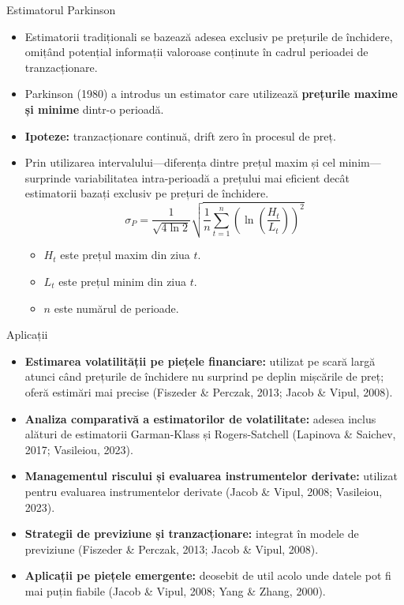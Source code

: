 \documentclass[9pt, aspectratio=169, t]{beamer}
\theoremstyle{definition}
\begin{document}
\begin{frame}{Estimatorul Parkinson}
\begin{itemize}
    \item Estimatorii tradiționali se bazează adesea exclusiv pe prețurile de închidere, omițând potențial informații valoroase conținute în cadrul perioadei de tranzacționare.
    \item Parkinson (1980) a introdus un estimator care utilizează \textbf{prețurile maxime și minime} dintr-o perioadă.
    \item \textbf{Ipoteze:} tranzacționare continuă, drift zero în procesul de preț.
    \item Prin utilizarea intervalului---diferența dintre prețul maxim și cel minim---surprinde variabilitatea intra-perioadă a prețului mai eficient decât estimatorii bazați exclusiv pe prețuri de închidere.
    \[
    \sigma_P = \frac{1}{\sqrt{4\ln 2}}\sqrt{\frac{1}{n}\sum_{t=1}^{n}\left(\ln\left(\frac{H_t}{L_t}\right)\right)^2}
    \]
    \begin{itemize}
        \item $H_t$ este prețul maxim din ziua $t$.
        \item $L_t$ este prețul minim din ziua $t$.
        \item $n$ este numărul de perioade.
    \end{itemize}
\end{itemize}
\end{frame}

\begin{frame}{Aplicații}
\begin{itemize}
    \item \textbf{Estimarea volatilității pe piețele financiare:} utilizat pe scară largă atunci când prețurile de închidere nu surprind pe deplin mișcările de preț; oferă estimări mai precise (Fiszeder \& Perczak, 2013; Jacob \& Vipul, 2008).
    \item \textbf{Analiza comparativă a estimatorilor de volatilitate:} adesea inclus alături de estimatorii Garman-Klass și Rogers-Satchell (Lapinova \& Saichev, 2017; Vasileiou, 2023).
    \item \textbf{Managementul riscului și evaluarea instrumentelor derivate:} utilizat pentru evaluarea instrumentelor derivate (Jacob \& Vipul, 2008; Vasileiou, 2023).
    \item \textbf{Strategii de previziune și tranzacționare:} integrat în modele de previziune (Fiszeder \& Perczak, 2013; Jacob \& Vipul, 2008).
    \item \textbf{Aplicații pe piețele emergente:} deosebit de util acolo unde datele pot fi mai puțin fiabile (Jacob \& Vipul, 2008; Yang \& Zhang, 2000).
\end{itemize}
\end{frame}
\end{document}
